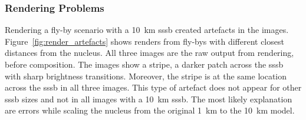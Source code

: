 \subsubsection{Rendering Problems} \label{sec:render_problems}
Rendering a fly-by scenario with a \SI{10}{\kilo\meter} \gls{sssb} created artefacts in the images. Figure~\ref{fig:render_artefacts} shows renders from fly-bys with different closest distances from the nucleus. All three images are the raw output from rendering, before composition. The images show a stripe, a darker patch across the \gls{sssb} with sharp brightness transitions. Moreover, the stripe is at the same location across the \gls{sssb} in all three images. This type of artefact does not appear for other \gls{sssb} sizes and not in all images with a \SI{10}{\kilo\meter} \gls{sssb}. The most likely explanation are errors while scaling the nucleus from the original \SI{1}{\kilo\meter} to the \SI{10}{\kilo\meter} model.
